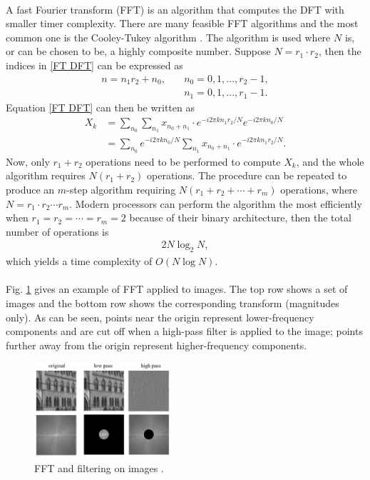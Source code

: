 \documentclass[12pt, twocolumn]{report}
\begin{document}
\paragraph{}
A fast Fourier transform (FFT) is an algorithm that computes the DFT with smaller timer complexity. There are many feasible FFT algorithms and the most common one is the Cooley-Tukey algorithm \cite{FT FFT}. The algorithm is used where $N$ is, or can be chosen to be, a highly composite number. Suppose $N = r_1 \cdot r_2$, then the indices in \eqref{FT DFT} can be expressed as
\begin{align*}
    n = n_1r_2 + n_0, \quad & n_0 = 0, 1, ..., r_2 - 1, \\
    & n_1 = 0, 1, ..., r_1 - 1.
\end{align*}
Equation \eqref{FT DFT} can then be written as
\begin{align*}
    X_k & = \sum_{n_0}\sum_{n_1} x_{n_0 + n_1} \cdot e^{-i2\pi kn_1r_2/N} e^{-i2\pi kn_0/N} \\
    & = \sum_{n_0} e^{-i2\pi kn_0/N} \sum_{n_1} x_{n_0 + n_1} \cdot e^{-i2\pi kn_1r_2/N}.
\end{align*}
Now, only $r_1 + r_2$ operations need to be performed to compute $X_k$, and the whole algorithm requires $N(r_1 + r_2)$ operations. The procedure can be repeated to produce an $m$-step algorithm requiring $N(r_1 + r_2 + \cdots + r_m)$ operations, where $N = r_1 \cdot r_2 \cdots r_m$. Modern processors can perform the algorithm the most efficiently when $r_1 = r_2 = \cdots = r_m = 2$ because of their binary architecture, then the total number of operations is
\begin{align*}
    2N\log_2 N,
\end{align*}
which yields a time complexity of $O(N\log N)$. 

\paragraph{}
Fig. \ref{FT FFT on images} gives an example of FFT applied to images. The top row shows a set of images and the bottom row shows the corresponding transform (magnitudes only). As can be seen, points near the origin represent lower-frequency components and are cut off when a high-pass filter is applied to the image; points further away from the origin represent higher-frequency components.

\begin{figure}[htbp]
    \centering
    \includegraphics[width=0.45\textwidth]{Figures/FT FFT on images cropped.jpg}
    \caption{FFT and filtering on images \cite{FT lecture}.}
    \label{FT FFT on images}
\end{figure}
\end{document}
